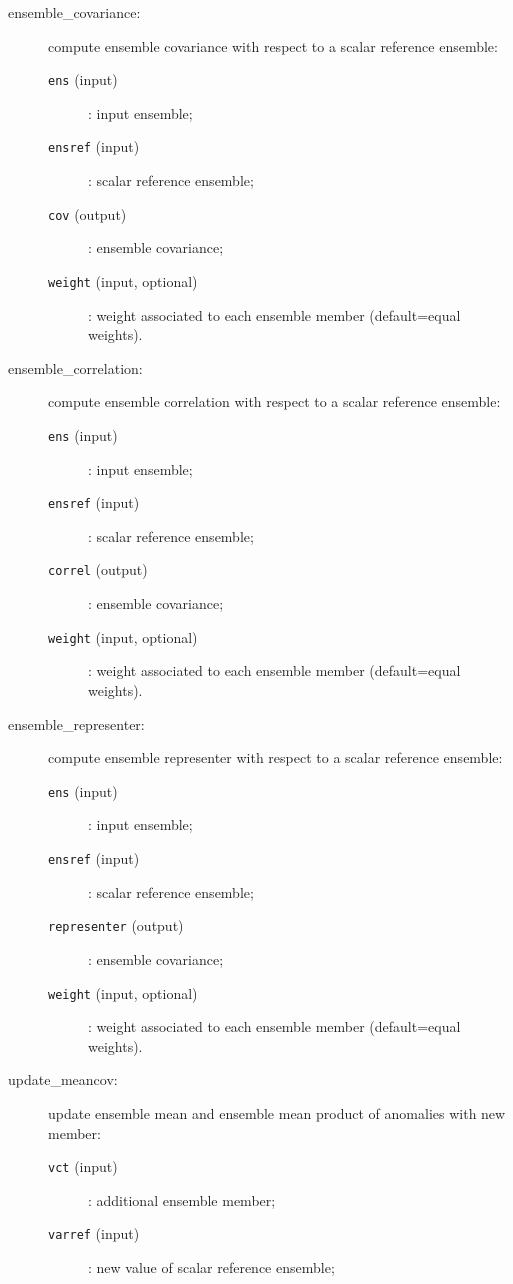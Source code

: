 \documentclass[11pt]{article}
\begin{document}
\begin{description}
\item[ensemble\_covariance:] compute ensemble covariance with respect to a scalar reference ensemble:
  \begin{description}
  \item[{\tt ens} (input)]: input ensemble;
  \item[{\tt ensref} (input)]: scalar reference ensemble;
  \item[{\tt cov} (output)]: ensemble covariance;
  \item[{\tt weight} (input, optional)]: weight associated to each ensemble member
                                         (default=equal weights).
  \end{description}
\item[ensemble\_correlation:] compute ensemble correlation with respect to a scalar reference ensemble:
  \begin{description}
  \item[{\tt ens} (input)]: input ensemble;
  \item[{\tt ensref} (input)]: scalar reference ensemble;
  \item[{\tt correl} (output)]: ensemble covariance;
  \item[{\tt weight} (input, optional)]: weight associated to each ensemble member
                                         (default=equal weights).
  \end{description}
\item[ensemble\_representer:] compute ensemble representer with respect to a scalar reference ensemble:
  \begin{description}
  \item[{\tt ens} (input)]: input ensemble;
  \item[{\tt ensref} (input)]: scalar reference ensemble;
  \item[{\tt representer} (output)]: ensemble covariance;
  \item[{\tt weight} (input, optional)]: weight associated to each ensemble member
                                         (default=equal weights).
  \end{description}
\item[update\_meancov:] update ensemble mean and ensemble mean product of anomalies with new member:
  \begin{description}
  \item[{\tt vct} (input)]: additional ensemble member;
  \item[{\tt varref} (input)]: new value of scalar reference ensemble;

\end{description}
\end{description}
\end{document}
